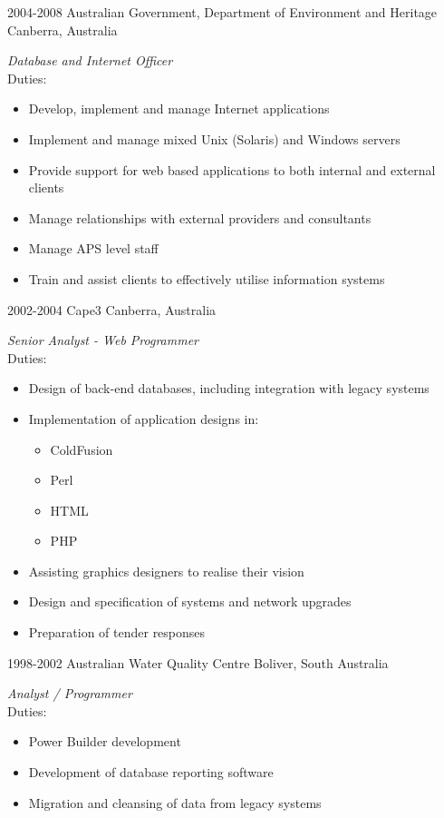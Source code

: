 \documentclass[]{friggeri-cv} %
\begin{document}
\begin{entrylist}
\entry
{2004-2008}
{Australian Government, Department of Environment and Heritage}
{Canberra, Australia}
{\emph{Database and Internet Officer} \\
Duties:
\begin{itemize}
\item Develop, implement and manage Internet applications
\item Implement and manage mixed Unix (Solaris) and Windows servers
\item Provide support for web based applications to both internal and external clients
\item Manage relationships with external providers and consultants
\item Manage APS level staff
\item Train and assist clients to effectively utilise information systems
\end{itemize}}
\entry
{2002-2004}
{Cape3}
{Canberra, Australia}
{\emph{Senior Analyst - Web Programmer} \\
Duties:
\begin{itemize}
\item Design of back-end databases, including integration with legacy systems
\item Implementation of application designs in:
\begin{itemize}
\item ColdFusion
\item Perl
\item HTML
\item PHP
\end{itemize}
\item Assisting graphics designers to realise their vision
\item Design and specification of systems and network upgrades
\item Preparation of tender responses
\end{itemize}}
\entry
{1998-2002}
{Australian Water Quality Centre}
{Boliver, South Australia}
{\emph{Analyst / Programmer} \\
Duties:
\begin{itemize}
\item Power Builder development
\item Development of database reporting software
\item Migration and cleansing of data from legacy systems

\end{itemize}}
\end{entrylist}
\end{document}
